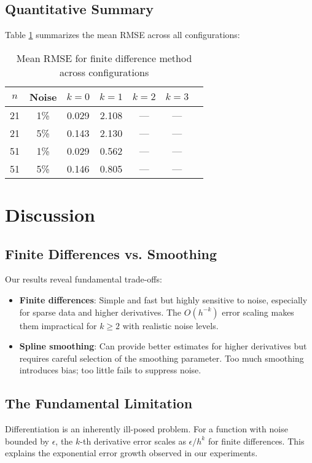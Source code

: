 \documentclass[11pt,a4paper]{article}
\begin{document}
\subsection{Quantitative Summary}

Table \ref{tab:results} summarizes the mean RMSE across all configurations:

\begin{table}[H]
\centering
\caption{Mean RMSE for finite difference method across configurations}
\label{tab:results}
\begin{tabular}{ccccccc}
\toprule
$n$ & Noise & $k=0$ & $k=1$ & $k=2$ & $k=3$ \\
\midrule
21 & 1\% & 0.029 & 2.108 & --- & --- \\
21 & 5\% & 0.143 & 2.130 & --- & --- \\
51 & 1\% & 0.029 & 0.562 & --- & --- \\
51 & 5\% & 0.146 & 0.805 & --- & --- \\
\bottomrule
\end{tabular}
\end{table}

\section{Discussion}

\subsection{Finite Differences vs. Smoothing}

Our results reveal fundamental trade-offs:
\begin{itemize}
    \item \textbf{Finite differences}: Simple and fast but highly sensitive to noise, especially for sparse data and higher derivatives. The $O(h^{-k})$ error scaling makes them impractical for $k \geq 2$ with realistic noise levels.
    \item \textbf{Spline smoothing}: Can provide better estimates for higher derivatives but requires careful selection of the smoothing parameter. Too much smoothing introduces bias; too little fails to suppress noise.
\end{itemize}

\subsection{The Fundamental Limitation}

Differentiation is an inherently ill-posed problem. For a function with noise bounded by $\epsilon$, the $k$-th derivative error scales as $\epsilon/h^k$ for finite differences. This explains the exponential error growth observed in our experiments.
\end{document}
